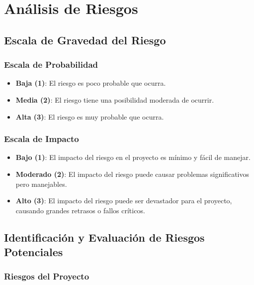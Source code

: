 \documentclass{article}
\begin{document}
\newpage

\section{Análisis de Riesgos}

\subsection{Escala de Gravedad del Riesgo}

\subsubsection{Escala de Probabilidad}

\begin{itemize}
    \item \textbf{Baja (1)}: El riesgo es poco probable que ocurra.
    \item \textbf{Media (2)}: El riesgo tiene una posibilidad moderada de ocurrir.
    \item \textbf{Alta (3)}: El riesgo es muy probable que ocurra.
\end{itemize}

\subsubsection{Escala de Impacto}

\begin{itemize}
    \item \textbf{Bajo (1)}: El impacto del riesgo en el proyecto es mínimo y fácil de manejar.
    \item \textbf{Moderado (2)}: El impacto del riesgo puede causar problemas significativos pero manejables.
    \item \textbf{Alto (3)}: El impacto del riesgo puede ser devastador para el proyecto, causando grandes retrasos o fallos críticos.
\end{itemize}

\subsection{Identificación y Evaluación de Riesgos Potenciales}

\subsubsection{Riesgos del Proyecto}
\end{document}
